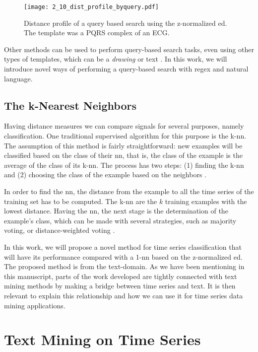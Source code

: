 \begin{figure}
\texttt{[image: 2\_10\_dist\_profile\_byquery.pdf]}
\caption{Distance profile of a query based search using the z-normalized \gls{ed}. The template was a PQRS complex of an ECG.}
\label{fig:query_based}
\end{figure}

Other methods can be used to perform query-based search tasks, even using other types of templates, which can be a \textit{drawing} \cite{qetch} or text \cite{text_query1}. In this work, we will introduce novel ways of performing a query-based search with \gls{regex} and natural language.

\subsection{The k-Nearest Neighbors}

Having distance measures we can compare signals for several purposes, namely classification. One traditional supervised algorithm for this purpose is the k-\gls{nn}. The assumption of this method is fairly straightforward: new examples will be classified based on the class of their \gls{nn}, that is, the class of the example is the average of the class of its k-\gls{nn}. The process has two steps: (1) finding the k-\gls{nn} and (2) choosing the class of the example based on the neighbors \cite{knn}.
\par
In order to find the \gls{nn}, the distance from the example to all the time series of the training set has to be computed. The k-\gls{nn} are the $k$ training examples with the lowest distance. Having the \gls{nn}, the next stage is the determination of the example's class, which can be made with several strategies, such as majority voting, or distance-weighted voting \cite{knn}.
\par
In this work, we will propose a novel method for time series classification that will have its performance compared with a 1-\gls{nn} based on the z-normalized \gls{ed}. The proposed method is from the text-domain. As we have been mentioning in this manuscript, parts of the work developed are tightly connected with text mining methods by making a bridge between time series and text. It is then relevant to explain this relationship and how we can use it for time series data mining applications. 

\section{Text Mining on Time Series}
\label{sec:text_time}

